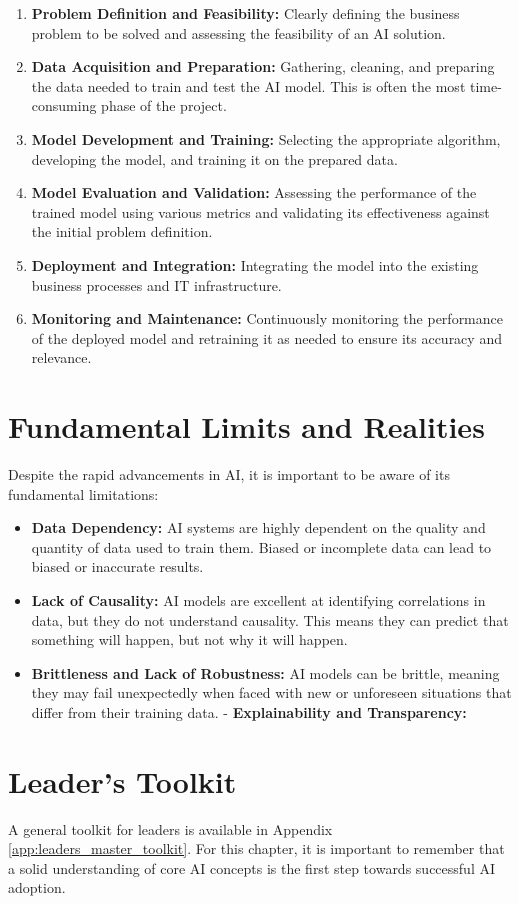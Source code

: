 \begin{enumerate}
    \item \textbf{Problem Definition and Feasibility:} Clearly defining the business problem to be solved and assessing the feasibility of an AI solution.
    \item \textbf{Data Acquisition and Preparation:} Gathering, cleaning, and preparing the data needed to train and test the AI model. This is often the most time-consuming phase of the project.
    \item \textbf{Model Development and Training:} Selecting the appropriate algorithm, developing the model, and training it on the prepared data.
    \item \textbf{Model Evaluation and Validation:} Assessing the performance of the trained model using various metrics and validating its effectiveness against the initial problem definition.
    \item \textbf{Deployment and Integration:} Integrating the model into the existing business processes and IT infrastructure.
    \item \textbf{Monitoring and Maintenance:} Continuously monitoring the performance of the deployed model and retraining it as needed to ensure its accuracy and relevance.
\end{enumerate}

\section{Fundamental Limits and Realities}
\label{sec:fundamental_limits}
Despite the rapid advancements in AI, it is important to be aware of its fundamental limitations:

\begin{itemize}
    \item \textbf{Data Dependency:} AI systems are highly dependent on the quality and quantity of data used to train them. Biased or incomplete data can lead to biased or inaccurate results.
    \item \textbf{Lack of Causality:} AI models are excellent at identifying correlations in data, but they do not understand causality. This means they can predict that something will happen, but not why it will happen.
    \item \textbf{Brittleness and Lack of Robustness:} AI models can be brittle, meaning they may fail unexpectedly when faced with new or unforeseen situations that differ from their training data.
    - \textbf{Explainability and Transparency:}
\end{itemize}

\section{Leader's Toolkit}
\label{sec:core_ai_leaders_toolkit}

A general toolkit for leaders is available in Appendix \ref{app:leaders_master_toolkit}. For this chapter, it is important to remember that a solid understanding of core AI concepts is the first step towards successful AI adoption.
